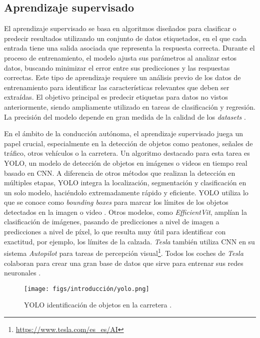 \subsection{Aprendizaje supervisado}

El aprendizaje supervisado se basa en algoritmos diseñados para clasificar o predecir resultados utilizando un conjunto de datos etiquetados, en el que cada entrada tiene una salida asociada que representa la respuesta correcta. Durante el proceso de entrenamiento, el modelo ajusta sus parámetros al analizar estos datos, buscando minimizar el error entre sus predicciones y las respuestas correctas. Este tipo de aprendizaje requiere un análisis previo de los datos de entrenamiento para identificar las características relevantes que deben ser extraídas. El objetivo principal es predecir etiquetas para datos no vistos anteriormente, siendo ampliamente utilizado en tareas de clasificación y regresión. La precisión del modelo depende en gran medida de la calidad de los \textit{datasets} \cite{supervised-learning}.

En el ámbito de la conducción autónoma, el aprendizaje supervisado juega un papel crucial, especialmente en la detección de objetos como peatones, señales de tráfico, otros vehículos o la carretera. Un algoritmo destacado para esta tarea es \ac{YOLO}, un modelo de detección de objetos en imágenes o videos en tiempo real basado en \ac{CNN}. A diferencia de otros métodos que realizan la detección en múltiples etapas, \ac{YOLO} integra la localización, segmentación y clasificación en un solo modelo, haciéndolo extremadamente rápido y eficiente. \ac{YOLO} utiliza lo que se conoce como \textit{bounding boxes} para marcar los límites de los objetos detectados en la imagen o video \cite{yolo}. Otros modelos, como \textit{EfficientVit}, amplían la clasificación de imágenes, pasando de predicciones a nivel de imagen a predicciones a nivel de píxel, lo que resulta muy útil para identificar con exactitud, por ejemplo, los límites de la calzada. \textit{Tesla} también utiliza \ac{CNN} en su sistema \textit{Autopilot} para tareas de percepción visual\footnote{\url{https://www.tesla.com/es_es/AI}}. Todos los coches de \textit{Tesla} colaboran para crear una gran base de datos que sirve para entrenar sus redes neuronales \cite{tesla-dataset}. 

\begin{figure}[ht]
\begin{center}
\texttt{[image: figs/introducción/yolo.png]}
\end{center}
\caption{YOLO identificación de objetos en la carretera \cite{yolo-detection}.}
\label{yolo}
\end{figure}

